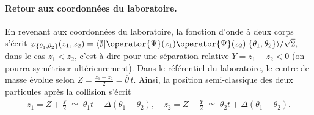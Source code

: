 





\paragraph{Retour aux coordonnées du laboratoire.}

En revenant aux coordonnées du laboratoire, la fonction d’onde à deux corps s’écrit
\(
	\varphi_{\{\theta_1 , \theta_2\}} (z_1, z_2) 
	= \langle \emptyset \vert \operator{\Psi} (z_1)\operator{\Psi} (z_2) \vert \{\theta_1, \theta_2\} \rangle/\sqrt{2},
\)
dans le cas \(z_1 < z_2\), c’est-à-dire pour une séparation relative \(Y = z_1 - z_2 < 0\) (on pourra symétriser ultérieurement).  
Dans le référentiel du laboratoire, le centre de masse évolue selon
\(
	Z = \frac{z_1 + z_2}{2} = \overline{\theta}\,t.
\)
Ainsi, la position semi-classique des deux particules après la collision s’écrit
\begin{eqnarray}
	z_1 = Z + \frac{Y}{2} \;\simeq\; \theta_1 t - \Delta(\theta_1 - \theta_2),\quad
	z_2 = Z - \frac{Y}{2} \;\simeq\; \theta_2 t + \Delta(\theta_1 - \theta_2).
\end{eqnarray}

